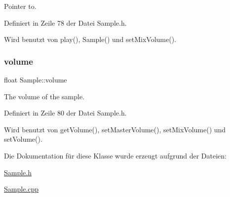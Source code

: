 Pointer to. 



Definiert in Zeile 78 der Datei Sample.\+h.



Wird benutzt von play(), Sample() und set\+Mix\+Volume().

\mbox{\label{class_sample_a74a4b4799b2bdec9fdde363992b9cec8}} 
\subsubsection{\texorpdfstring{volume}{volume}}
{\footnotesize\ttfamily float Sample\+::volume\hspace{0.3cm}{\ttfamily [private]}}



The volume of the sample. 



Definiert in Zeile 80 der Datei Sample.\+h.



Wird benutzt von get\+Volume(), set\+Master\+Volume(), set\+Mix\+Volume() und set\+Volume().



Die Dokumentation für diese Klasse wurde erzeugt aufgrund der Dateien\+:\begin{DoxyCompactItemize}
\item 
\hyperlink{_sample_8h}{Sample.\+h}\item 
\hyperlink{_sample_8cpp}{Sample.\+cpp}\end{DoxyCompactItemize}
